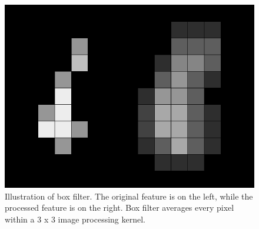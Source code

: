 \documentclass[12pt]{report}
\begin{document}
\begin{figure}[h]
    \centering
    \includegraphics[scale=0.25]{figures/box_filter.png}
    \caption{Illustration of box filter. The original feature is on the left, while the processed feature is on the right. Box filter averages every pixel within a 3 x 3 image processing kernel.}
    \label{fig:box_filter}
\end{figure}
\end{document}
